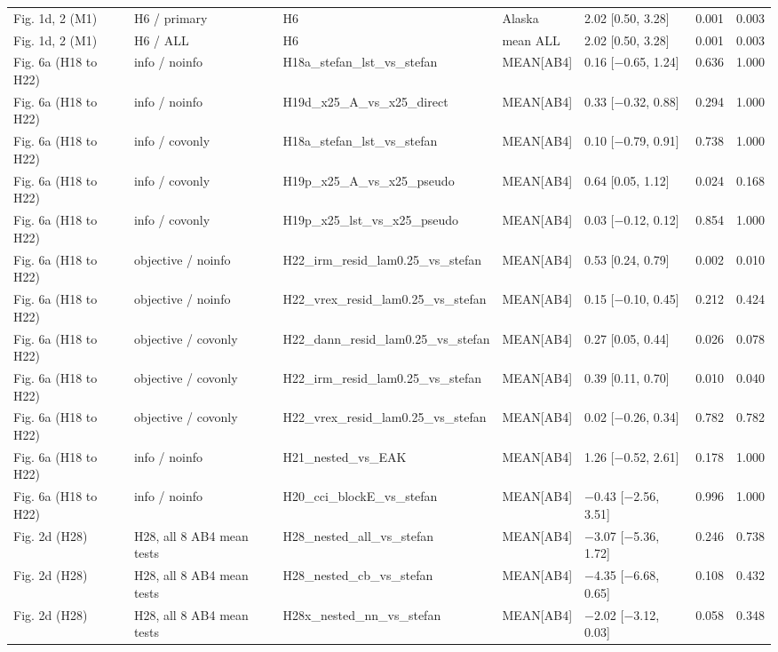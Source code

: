 \begin{longtable}{lllllrr}
Fig. 1d, 2 (M1) & H6 / primary & H6 & Alaska & 2.02 [0.50, 3.28] & 0.001 & 0.003 \\
Fig. 1d, 2 (M1) & H6 / ALL & H6 & mean ALL & 2.02 [0.50, 3.28] & 0.001 & 0.003 \\
Fig. 6a (H18 to H22) & info / noinfo & H18a\_stefan\_lst\_vs\_stefan & MEAN[AB4] & 0.16 [$-$0.65, 1.24] & 0.636 & 1.000 \\
Fig. 6a (H18 to H22) & info / noinfo & H19d\_x25\_A\_vs\_x25\_direct & MEAN[AB4] & 0.33 [$-$0.32, 0.88] & 0.294 & 1.000 \\
Fig. 6a (H18 to H22) & info / covonly & H18a\_stefan\_lst\_vs\_stefan & MEAN[AB4] & 0.10 [$-$0.79, 0.91] & 0.738 & 1.000 \\
Fig. 6a (H18 to H22) & info / covonly & H19p\_x25\_A\_vs\_x25\_pseudo & MEAN[AB4] & 0.64 [0.05, 1.12] & 0.024 & 0.168 \\
Fig. 6a (H18 to H22) & info / covonly & H19p\_x25\_lst\_vs\_x25\_pseudo & MEAN[AB4] & 0.03 [$-$0.12, 0.12] & 0.854 & 1.000 \\
Fig. 6a (H18 to H22) & objective / noinfo & H22\_irm\_resid\_lam0.25\_vs\_stefan & MEAN[AB4] & 0.53 [0.24, 0.79] & 0.002 & 0.010 \\
Fig. 6a (H18 to H22) & objective / noinfo & H22\_vrex\_resid\_lam0.25\_vs\_stefan & MEAN[AB4] & 0.15 [$-$0.10, 0.45] & 0.212 & 0.424 \\
Fig. 6a (H18 to H22) & objective / covonly & H22\_dann\_resid\_lam0.25\_vs\_stefan & MEAN[AB4] & 0.27 [0.05, 0.44] & 0.026 & 0.078 \\
Fig. 6a (H18 to H22) & objective / covonly & H22\_irm\_resid\_lam0.25\_vs\_stefan & MEAN[AB4] & 0.39 [0.11, 0.70] & 0.010 & 0.040 \\
Fig. 6a (H18 to H22) & objective / covonly & H22\_vrex\_resid\_lam0.25\_vs\_stefan & MEAN[AB4] & 0.02 [$-$0.26, 0.34] & 0.782 & 0.782 \\
Fig. 6a (H18 to H22) & info / noinfo & H21\_nested\_vs\_EAK & MEAN[AB4] & 1.26 [$-$0.52, 2.61] & 0.178 & 1.000 \\
Fig. 6a (H18 to H22) & info / noinfo & H20\_cci\_blockE\_vs\_stefan & MEAN[AB4] & $-$0.43 [$-$2.56, 3.51] & 0.996 & 1.000 \\
Fig. 2d (H28) & H28, all 8 AB4 mean tests & H28\_nested\_all\_vs\_stefan & MEAN[AB4] & $-$3.07 [$-$5.36, 1.72] & 0.246 & 0.738 \\
Fig. 2d (H28) & H28, all 8 AB4 mean tests & H28\_nested\_cb\_vs\_stefan & MEAN[AB4] & $-$4.35 [$-$6.68, 0.65] & 0.108 & 0.432 \\
Fig. 2d (H28) & H28, all 8 AB4 mean tests & H28x\_nested\_nn\_vs\_stefan & MEAN[AB4] & $-$2.02 [$-$3.12, 0.03] & 0.058 & 0.348 \\

\end{longtable}
